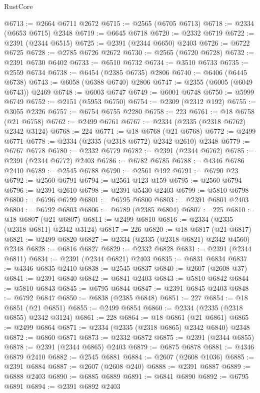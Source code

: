 \begin{lexlean}{RustCore}
\begin{coremodule}
@6713 := @2664 @6711 @2672
@6715 := @2565 (@6705 @6713)
@6718 := @2334 (@6653 @6715) @2348
@6719 := @6645 @6718
@6720 := @2332 @6719
@6722 := @2391 (@2344 @6515)
@6725 := @2391 (@2344 @6650) @2403
@6726 := @6722 @6725
@6728 := @2785 @6726 @2672
@6730 := @2565 (@6720 @6728)
@6732 := @2391 @6730 @6402
@6733 := @6510 @6732
@6734 := @3510 @6733
@6735 := @2559 @6734
@6738 := @6454 (@2385 @6735) @2806
@6740 := @6406 (@6445 @6738)
@6743 := @6058 (@6388 @6740) @2806
@6747 := @2355 (@6005 (@6049 @6743)) @2469
@6748 := @6003 @6747
@6749 := @6001 @6748
@6750 := @5999 @6749
@6752 := @2151 (@5953 @6750)
@6754 := @2309 (@2312 @192)
@6755 := @3055 @2326
@6757 := @6754 @6755 @2280
@6758 := 223
@6761 := @18 @6758 (@21 @6758)
@6762 := @2499 @6761
@6767 := @2334 (@2335 (@2318 @6762) @2342 @3124)
@6768 := 224
@6771 := @18 @6768 (@21 @6768)
@6772 := @2499 @6771
@6778 := @2334 (@2335 (@2318 @6772) @2342 @2610) @2348
@6779 := @6767 @6778
@6780 := @2332 @6779
@6782 := @2391 (@2344 @6762)
@6785 := @2391 (@2344 @6772) @2403
@6786 := @6782 @6785
@6788 := @4346 @6786 @2410
@6789 := @2545 @6788
@6790 := @2561 @192
@6791 := @6790 @23
@6792 := @2560 @6791
@6794 := @2561 @123 @159
@6795 := @2560 @6794
@6796 := @2391 @2610
@6798 := @2391 @5430 @2403
@6799 := @5810 @6798
@6800 := @6796 @6799
@6801 := @6795 @6800
@6803 := @2391 @6801 @2403
@6804 := @6792 @6803
@6806 := @6789 (@2385 @6804)
@6807 := 225
@6810 := @18 @6807 (@21 @6807)
@6811 := @2499 @6810
@6816 := @2334 (@2335 (@2318 @6811) @2342 @3124)
@6817 := 226
@6820 := @18 @6817 (@21 @6817)
@6821 := @2499 @6820
@6827 := @2334 (@2335 (@2318 @6821) @2342 @4560) @2348
@6828 := @6816 @6827
@6829 := @2332 @6828
@6831 := @2391 (@2344 @6811)
@6834 := @2391 (@2344 @6821) @2403
@6835 := @6831 @6834
@6837 := @4346 @6835 @2410
@6838 := @2545 @6837
@6840 := @2607 (@2608 @37)
@6841 := @2391 @6840
@6842 := @6841 @2403
@6843 := @5810 @6842
@6844 := @5810 @6843
@6845 := @6795 @6844
@6847 := @2391 @6845 @2403
@6848 := @6792 @6847
@6850 := @6838 (@2385 @6848)
@6851 := 227
@6854 := @18 @6851 (@21 @6851)
@6855 := @2499 @6854
@6860 := @2334 (@2335 (@2318 @6855) @2342 @3124)
@6861 := 228
@6864 := @18 @6861 (@21 @6861)
@6865 := @2499 @6864
@6871 := @2334 (@2335 (@2318 @6865) @2342 @6840) @2348
@6872 := @6860 @6871
@6873 := @2332 @6872
@6875 := @2391 (@2344 @6855)
@6878 := @2391 (@2344 @6865) @2403
@6879 := @6875 @6878
@6881 := @4346 @6879 @2410
@6882 := @2545 @6881
@6884 := @2607 (@2608 @1036)
@6885 := @2391 @6884
@6887 := @2607 (@2608 @240)
@6888 := @2391 @6887
@6889 := @6888 @2403
@6890 := @6885 @6889
@6891 := @6841 @6890
@6892 := @6795 @6891
@6894 := @2391 @6892 @2403

\end{coremodule}
\end{lexlean}
